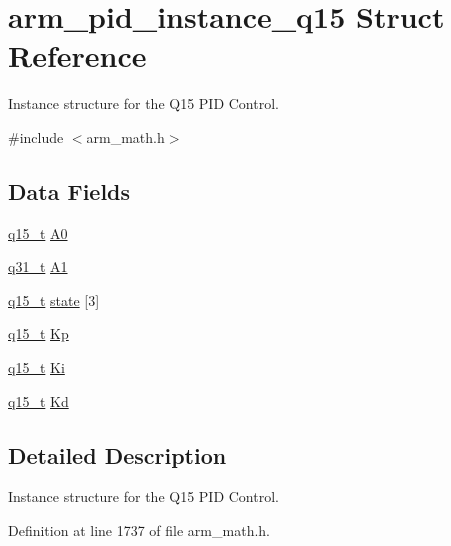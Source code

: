 \hypertarget{structarm__pid__instance__q15}{}\section{arm\+\_\+pid\+\_\+instance\+\_\+q15 Struct Reference}
\label{structarm__pid__instance__q15}


Instance structure for the Q15 P\+ID Control.  




{\ttfamily \#include $<$arm\+\_\+math.\+h$>$}

\subsection*{Data Fields}
\begin{DoxyCompactItemize}
\item 
\hyperlink{arm__math_8h_ab5a8fb21a5b3b983d5f54f31614052ea}{q15\+\_\+t} \hyperlink{structarm__pid__instance__q15_a1aa73268c65cea0c7bc66bb70ff35205}{A0}
\item 
\hyperlink{arm__math_8h_adc89a3547f5324b7b3b95adec3806bc0}{q31\+\_\+t} \hyperlink{structarm__pid__instance__q15_aeb897c84724b56948e4222aca8d0e1f4}{A1}
\item 
\hyperlink{arm__math_8h_ab5a8fb21a5b3b983d5f54f31614052ea}{q15\+\_\+t} \hyperlink{structarm__pid__instance__q15_a4c4e19d77015f5f7a31a1daf0faf31b6}{state} \mbox{[}3\mbox{]}
\item 
\hyperlink{arm__math_8h_ab5a8fb21a5b3b983d5f54f31614052ea}{q15\+\_\+t} \hyperlink{structarm__pid__instance__q15_afef61fb3b64c73f2cd0c91d9dcf95679}{Kp}
\item 
\hyperlink{arm__math_8h_ab5a8fb21a5b3b983d5f54f31614052ea}{q15\+\_\+t} \hyperlink{structarm__pid__instance__q15_a19d5059baf06dd52266260d096702d0a}{Ki}
\item 
\hyperlink{arm__math_8h_ab5a8fb21a5b3b983d5f54f31614052ea}{q15\+\_\+t} \hyperlink{structarm__pid__instance__q15_abf38d18de1e16bc6d86846fedf8534fe}{Kd}
\end{DoxyCompactItemize}


\subsection{Detailed Description}
Instance structure for the Q15 P\+ID Control. 

Definition at line 1737 of file arm\+\_\+math.\+h.



